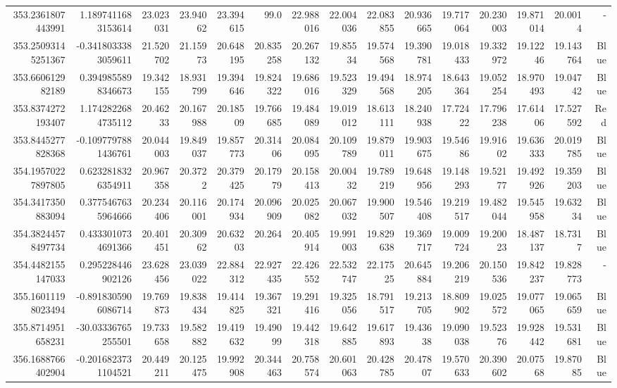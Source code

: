 \begin{center}
\begin{longtable}{rrrrrrrrrrrrrrr}
353.2361807443991 & 1.1897411683153614 & 23.023031 & 23.94062 & 23.394615 & 99.0 & 22.988016 & 22.004036 & 22.083855 & 20.936665 & 19.717064 & 20.230003 & 19.871014 & 20.0014 & - \\
353.25093145251367 & -0.3418033383059611 & 21.520702 & 21.15973 & 20.648195 & 20.835258 & 20.267132 & 19.85534 & 19.574568 & 19.390781 & 19.018433 & 19.332972 & 19.12246 & 19.143764 & Blue \\
353.660612982189 & 0.3949855898346673 & 19.342155 & 18.931799 & 19.394646 & 19.824322 & 19.686016 & 19.523329 & 19.494568 & 18.974205 & 18.643364 & 19.052254 & 18.970493 & 19.04742 & Blue \\
353.8374272193407 & 1.1742822684735112 & 20.46233 & 20.167988 & 20.18509 & 19.766685 & 19.484089 & 19.019012 & 18.613111 & 18.240938 & 17.72422 & 17.796238 & 17.61406 & 17.527592 & Red \\
353.8445277828368 & -0.1097797881436761 & 20.044003 & 19.849037 & 19.857773 & 20.31406 & 20.084095 & 20.109789 & 19.879011 & 19.903675 & 19.54686 & 19.91602 & 19.636333 & 20.019785 & Blue \\
354.19570227897805 & 0.6232818326354911 & 20.967358 & 20.3722 & 20.379425 & 20.17979 & 20.158413 & 20.00432 & 19.789219 & 19.648956 & 19.148293 & 19.52177 & 19.492926 & 19.359203 & Blue \\
354.3417350883094 & 0.3775467635964666 & 20.234406 & 20.116001 & 20.174934 & 20.096909 & 20.025082 & 20.067032 & 19.900507 & 19.546408 & 19.219517 & 19.482044 & 19.545958 & 19.63234 & Blue \\
354.38244578497734 & 0.4333010734691366 & 20.401451 & 20.30962 & 20.63203 & 20.264 & 20.405914 & 19.991003 & 19.829638 & 19.369717 & 19.009724 & 19.20023 & 18.487137 & 18.7317 & Blue \\
354.4482155147033 & 0.295228446902126 & 23.628456 & 23.039022 & 22.884312 & 22.927435 & 22.426552 & 22.532747 & 22.17525 & 20.645884 & 19.206219 & 20.150536 & 19.842237 & 19.828773 & - \\
355.16011198023494 & -0.8918305906086714 & 19.769873 & 19.838434 & 19.414825 & 19.367321 & 19.291416 & 19.325056 & 18.791517 & 19.213705 & 18.809902 & 19.025572 & 19.077065 & 19.065659 & Blue \\
355.8714951658231 & -30.03336765255501 & 19.733658 & 19.582882 & 19.419632 & 19.49099 & 19.442318 & 19.642885 & 19.617893 & 19.43638 & 19.090038 & 19.52376 & 19.928442 & 19.531681 & Blue \\
356.1688766402904 & -0.2016823731104521 & 20.449211 & 20.125475 & 19.992908 & 20.344463 & 20.758574 & 20.601063 & 20.428785 & 20.47807 & 19.570633 & 20.390602 & 20.07568 & 19.87085 & Blue \\

\end{longtable}
\end{center}
